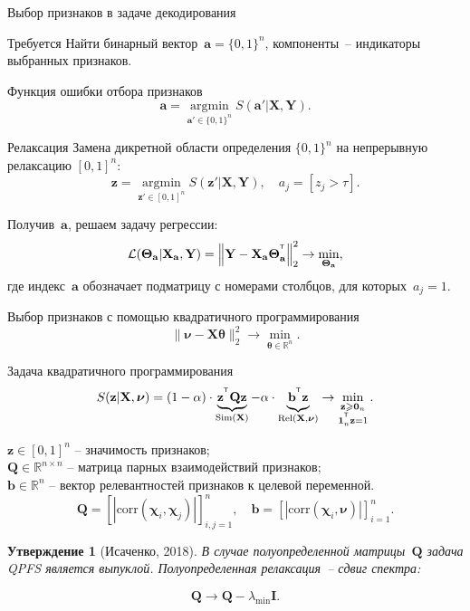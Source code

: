\documentclass[9pt]{beamer}
\renewcommand{\geq}{\ensuremath{\geqslant}}
\newcommand{\ba}{\mathbf{a}}
\newcommand{\bb}{\mathbf{b}}
\newcommand{\bz}{\mathbf{z}}
\newcommand{\bQ}{\mathbf{Q}}
\newcommand{\bX}{\mathbf{X}}
\newcommand{\bY}{\mathbf{Y}}
\newcommand{\bbR}{\mathbb{R}}
\newcommand{\bchi}{\boldsymbol{\chi}}
\newcommand{\bnu}{\boldsymbol{\nu}}
\newcommand{\btheta}{\boldsymbol{\theta}}
\newcommand{\bTheta}{\boldsymbol{\Theta}}
\newcommand{\T}{^{\text{\tiny\sffamily\upshape\mdseries T}}}
\newcommand{\bOne}{\boldsymbol{1}}
\newcommand{\bZero}{\boldsymbol{0}}
\newcommand{\argmin}{\mathop{\arg \min}\limits}
\newtheorem{statement}{Утверждение}
\begin{document}
\begin{frame}{Выбор признаков в задаче декодирования}
\begin{block}{Требуется}
Найти бинарный вектор~$\ba = \{0, 1\}^n$, компоненты~-- индикаторы выбранных признаков. 
\end{block}
\begin{block}{Функция ошибки отбора признаков}
	\vspace{-0.2cm}
\[
\ba = \argmin_{\ba' \in \{0, 1\}^n} S(\ba' | \bX, \bY).
\]
\vspace{-0.5cm}
\end{block}
\begin{block}{Релаксация}
	Замена дикретной области определения $\{0, 1\}^n$ на непрерывную релаксацию $[0, 1]^n$:
	\[
	\bz = \argmin_{\bz' \in [0, 1]^n} S(\bz' | \bX, \bY), \quad 
	a_j = [z_j > \tau].
\]
\end{block}
Получив~$\ba$, решаем задачу регрессии:
\[
\mathcal{L}(\bTheta_{\ba} | \bX_{\ba}, \bY) = {\left\| \mathbf{Y} - \bX_{\ba}\bTheta^{\T}_{\ba} \right\| }_2^2 \rightarrow\min_{\bTheta_{\ba}},
\]
где индекс~$\ba$ обозначает подматрицу с номерами столбцов, для которых~$a_j = 1$.
\end{frame}
\begin{frame}{Выбор признаков с помощью квадратичного программирования}
	\[
	\| \bnu - \bX \btheta\|_2^2 \rightarrow\min_{\btheta \in \bbR^{n}}.
	\]
	\vspace{-0.3cm}
	\begin{block}{Задача квадратичного программирования}
	\vspace{-0.3cm}
	\[
	S(\bz | \bX, \bnu)	= (1 - \alpha) \cdot \underbrace{\bz^{\T} \bQ \bz}_{\text{Sim}(\bX)} - \alpha \cdot \underbrace{\vphantom{()} \mathbf{b}^{\T} \bz}_{\text{Rel}(\bX, \bnu)} \rightarrow \min_{\substack{\bz \geq \bZero_n \\ \bOne_n^{\T} \bz=1}}.
	\]
	\end{block}
		$\bz \in [0, 1]^n$ -- значимость признаков; \\
		$\bQ \in \bbR^{n \times n}$ -- матрица парных взаимодействий признаков; \\
		$\mathbf{b} \in \bbR^n$ -- вектор релевантностей признаков к целевой переменной.
		\[
		\bQ = \left[\left|\text{corr}(\bchi_i, \bchi_j)\right|\right]_{i,j=1}^n, \quad
		\bb = \left[\left|\text{corr}(\bchi_i, \bnu)\right|\right]_{i=1}^n.
		\]
\vspace{-0.2cm}
\begin{statement}[Исаченко, 2018]
	В случае полуопределенной матрицы~$\bQ$ задача QPFS является выпуклой. 
	Полуопределенная релаксация~-- сдвиг спектра:
\end{statement}
\begin{equation*}
\bQ \rightarrow \bQ - \lambda_{\min} \mathbf{I}.
\end{equation*}
\end{frame}
\end{document}

